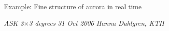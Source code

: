 \begin{frame}[fragile,t]
\frametitle{\hfill}
\vspace{\mytopbit}
{Example: Fine structure of aurora in real time}

\begin{center}
\end{center}

{\colblack \scriptsize \it ASK 3$\times$3 degrees 31 Oct 2006 Hanna Dahlgren, KTH} \\
\end{frame}

